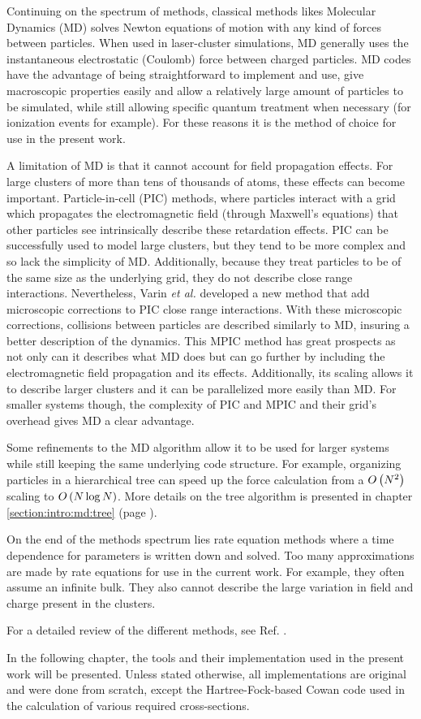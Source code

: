 Continuing on the spectrum of methods, classical methods likes Molecular
Dynamics (MD) solves Newton
equations of motion with any kind of forces between particles\cite{Skeel1998}.
When used in
laser-cluster simulations, MD generally uses the instantaneous electrostatic
(Coulomb) force between charged particles. MD codes have the advantage of being
straightforward to implement and use, give macroscopic properties easily and allow a
relatively large amount of particles to be simulated, while still allowing
specific quantum treatment when necessary (for ionization events for example). For
these reasons it is the method of choice for use in the present work.

A limitation of MD is that it cannot account for field propagation effects. For
large clusters of more than tens of thousands of atoms, these effects can become
important. Particle-in-cell (PIC) methods, where particles interact with a grid which propagates the
electromagnetic field (through Maxwell's equations) that other particles see
intrinsically describe these retardation effects. PIC can be successfully used
to model large clusters, but they tend to be more complex and so lack the
simplicity of MD. Additionally, because they treat particles to be of the same
size as the underlying grid, they do not describe close range interactions.
Nevertheless, Varin \textit{et al.} developed a new method that add microscopic
corrections to PIC close range interactions\cite{Varin2012}. With these microscopic
corrections, collisions between particles are described similarly to MD, insuring
a better description of the dynamics. This MPIC method has great prospects
as not only can it describes what MD does but can go further by including the
electromagnetic field propagation and its effects. Additionally, its scaling
allows it to describe larger clusters and it can be parallelized more easily
than MD. For smaller systems though, the complexity of PIC and MPIC and their
grid's overhead gives MD a clear advantage.

Some refinements to the MD algorithm allow it to be used for larger systems
while still keeping the same underlying code structure. For example, organizing
particles in a hierarchical tree\cite{Barnes1986,Gibbon2002} can speed up the force
calculation from a $O\left( N^2 \right)$ scaling to $O\left( N \log{N} \right)$. More details on the
tree algorithm is presented in chapter \ref{section:intro:md:tree} (page
\pageref{section:intro:md:tree}).

On the end of the methods spectrum lies rate equation methods where a time
dependence for parameters is written down and solved. Too many approximations
are made by rate equations for use in the current work. For example, they often
assume an infinite bulk. They also cannot describe the large variation in field
and charge present in the clusters.

For a detailed review of the different methods, see Ref. \cite{Fennel2010}.

In the following chapter, the tools and their implementation used in the present
work will be presented. Unless stated otherwise, all implementations are original
and were done from scratch, except the Hartree-Fock-based Cowan code\cite{CowanCode} used
in the calculation of various required cross-sections.


